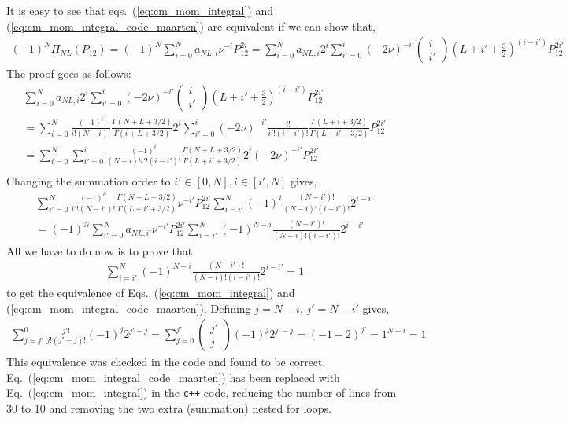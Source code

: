 \documentclass[10pt]{article}
\begin{document}
It is easy to see that eqs.~(\ref{eq:cm_mom_integral}) and (\ref{eq:cm_mom_integral_code_maarten}) are equivalent if we can show that,
\begin{align*}
(-1)^{N} \Pi_{NL}(P_{12}) = 
(-1)^{N} \sum_{i=0}^{N}  a_{NL,i}  \nu^{-i} P_{12}^{2i} = \sum_{i=0}^{N} a_{NL,i}  2^{i} 
	\sum_{i'=0}^{i}  (-2 \nu)^{-i'}	
	\left( \begin{array}{c} i \\ i' \end{array} \right)
	(L+i'+\frac{3}{2})^{(i-i')}
	 P_{12}^{2i'} 
\end{align*}
The proof goes as follows:
\begin{multline*}
\sum_{i=0}^{N} a_{NL,i}  2^{i} \sum_{i'=0}^{i}  (-2 \nu)^{-i'}\left( \begin{array}{c} i \\ i' \end{array} \right) (L+i'+\frac{3}{2})^{(i-i')} P_{12}^{2i'} \\
=  \sum_{i=0}^{N} \frac{(-1)^{i}}{i! (N-i)!} \frac{ \Gamma(N+L+3/2) }{ \Gamma(i + L + 3/2)} 2^{i} \sum_{i'=0}^{i}  (-2 \nu)^{-i'} \frac{ i!}{ i'! (i-i')!} \frac{\Gamma(L+i+3/2)}{ \Gamma( L + i' + 3/2)} P_{12}^{2i'} \\
= \sum_{i=0}^{N} \sum_{i'=0}^{i} \frac{(-1)^{i}}{ (N-i)! i'! (i-i')!} \frac{ \Gamma(N+L+3/2) }{ \Gamma( L + i' + 3/2) } 2^{i}   (-2 \nu)^{-i'} P_{12}^{2i'} \\
\end{multline*}
Changing the summation order to $ i' \in [0,N], i \in [i',N]$ gives,
\begin{multline*}
\sum_{i'=0}^{N} \frac{(-1)^{i'}}{ i'! (N-i')!} \frac{ \Gamma(N+L+3/2) }{ \Gamma( L + i' + 3/2) } \nu^{-i'} P_{12}^{2i'} \sum_{i=i'}^{N} (-1)^{i} \frac{(N-i')!}{(N-i)! (i-i')!} 2^{i-i'}\\
= (-1)^{N} \sum_{i'=0}^{N} a_{NL,i'} \nu^{-i'} P_{12}^{2i'} \sum_{i=i'}^{N} (-1)^{N-i} \frac{(N-i')!}{(N-i)! (i-i')!} 2^{i-i'}
\end{multline*}
All we have to do now is to prove that 
\begin{align*}
	\sum_{i=i'}^{N} (-1)^{N-i} \frac{(N-i')!}{(N-i)! (i-i')!} 2^{i-i'} = 1
\end{align*}
to get the equivalence of Eqs.~(\ref{eq:cm_mom_integral}) and (\ref{eq:cm_mom_integral_code_maarten}). Defining $j=N-i$, $j'=N-i'$ gives,
\begin{align*}
	\sum_{j=j'}^{0}  \frac{j'!}{j! (j'-j)!} (-1)^{j} 2^{j'-j} = \sum_{j=0}^{j'} \left( \begin{array}{c} j' \\ j \end{array} \right) (-1)^{j} 2^{j'-j} = ( -1 + 2 )^{j'} = 1^{N-i} = 1
\end{align*}
This equivalence was checked in the code and found to be correct. Eq.~(\ref{eq:cm_mom_integral_code_maarten}) has been replaced with Eq.~(\ref{eq:cm_mom_integral}) in the \texttt{c++} code, reducing the number of lines from 30 to 10 and removing the two extra (summation) nested for loops.
\end{document}
